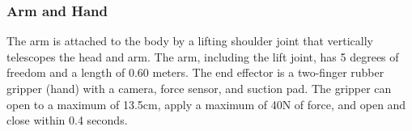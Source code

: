 \documentclass[11pt]{article}
\begin{document}
        \subsubsection{Arm and Hand}
            The arm is attached to the body by a lifting shoulder joint that vertically telescopes the head and arm. The arm, including the lift joint, has 5 degrees of freedom and a length of 0.60 meters. The end effector is a two-finger rubber gripper (hand) with a camera, force sensor, and suction pad. The gripper can open to a maximum of 13.5cm, apply a maximum of 40N of force, and open and close within 0.4 seconds.

            \begin{figure}[ht]
                \centering
                \quad
                \centering
                \quad
                \centering
                \quad
                \centering
\end{figure}
\end{document}
